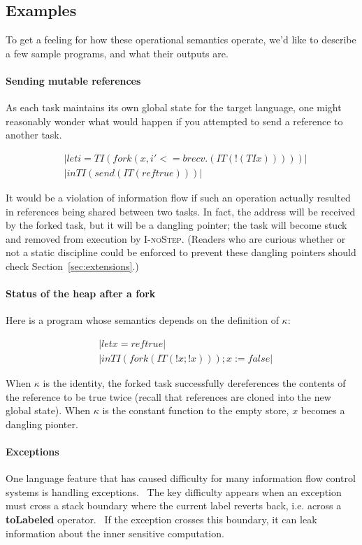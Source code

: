 \subsection{Examples}

To get a feeling for how these operational semantics operate, we'd like to
describe a few sample programs, and what their outputs are.

\paragraph{Sending mutable references}  As each task maintains its own
global state for the target language, one might reasonably wonder what would
happen if you attempted to send a reference to another task.

\begin{align*}
    & |let i = TI (fork (x, i' <= brecv . (IT (!(TI x)))))| \\
    & |in TI (send (IT (ref true)))|
\end{align*}

It would be a violation of information flow if such an operation actually
resulted in references being shared between two tasks.  In fact, the address
will be received by the forked task, but it will be a dangling pointer; the
task will become stuck and removed from execution by \textsc{I-noStep}.  (Readers
who are curious whether or not a static discipline could be enforced to
prevent these dangling pointers should check Section~\ref{sec:extensions}.)

\paragraph{Status of the heap after a fork}  Here is a program whose
semantics depends on the definition of $\kappa$:

\begin{align*}
    & |let x = ref true| \\
    & |in TI (fork (IT (!x; !x))); x := false|
\end{align*}

When $\kappa$ is the identity, the forked task successfully dereferences
the contents of the reference to be true twice (recall that references
are cloned into the new global state).  When $\kappa$ is the constant function
to the empty store, $x$ becomes a dangling pionter.

\paragraph{Exceptions}  One language feature that has caused difficulty
for many information flow control systems is handling
exceptions.~\cite{Hritcu:2013:YIB:2497621.2498098}  The key difficulty
appears when an exception must cross a stack boundary where the current
label reverts back, i.e. across a \textbf{toLabeled} operator.~\cite{lio}
If the exception crosses this boundary, it can leak information about the
inner sensitive computation.

